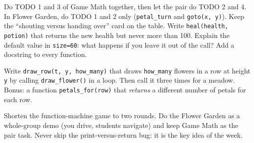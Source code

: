 \begin{differentiation}
\supportpath Do TODO 1 and 3 of Game Math together, then let the pair do TODO 2 and 4. In Flower Garden, do TODO 1 and 2 only
(\texttt{petal\_turn} and \texttt{goto(x, y)}). Keep the \enquote{shouting versus handing over} card on the table.
\extensionpath Write \texttt{heal(health, potion)} that returns the new health but never more than 100. Explain the default
value in \texttt{size=60}: what happens if you leave it out of the call? Add a docstring to every function.
\end{differentiation}

\begin{stretchchallenge}
Write \texttt{draw\_row(t, y, how\_many)} that draws \texttt{how\_many} flowers in a row at height \texttt{y} by calling
\texttt{draw\_flower()} in a loop. Then call it three times for a meadow. Bonus: a function \texttt{petals\_for(row)} that
\emph{returns} a different number of petals for each row.
\end{stretchchallenge}

\begin{teachernote}
Shorten the function-machine game to two rounds. Do the Flower Garden as a whole-group demo (you drive, students navigate)
and keep Game Math as the pair task. Never skip the print-versus-return bug: it is the key idea of the week.
\end{teachernote}
